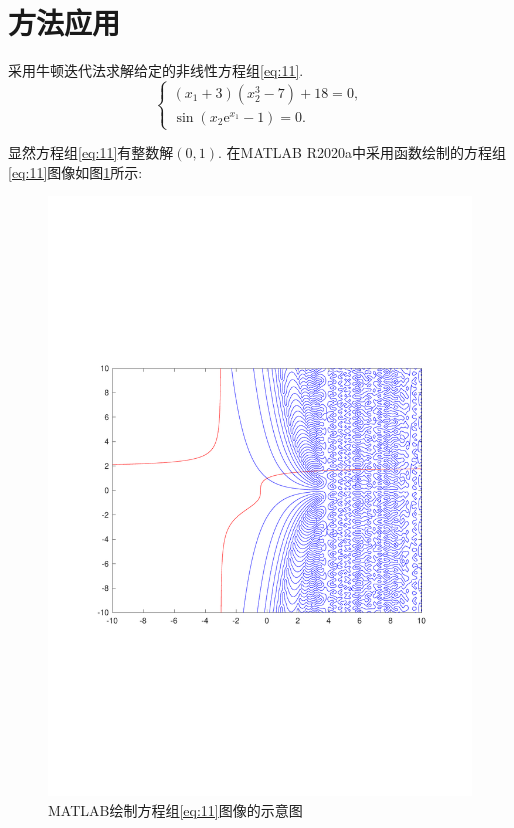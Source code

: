 \documentclass[cn,12pt,founder,a4paper]{elegantpaper}
\newcommand{\e}{\mathrm{e}}
\begin{document}
\section{方法应用}
\setcounter{table}{0}
\setcounter{figure}{0}
\setcounter{equation}{0}
采用牛顿迭代法求解给定的非线性方程组\eqref{eq:11}.
\begin{equation}\label{eq:11}
  \begin{cases}
    (x_1+3)(x_2^3-7)+18=0,\\
    \sin(x_2\e^{x_1}-1)=0.
  \end{cases}
\end{equation}\par
显然方程组\eqref{eq:11}有整数解\((0,1)\). 在M{\footnotesize{ATLAB}} R2020a中采用函数绘制的方程组\eqref{eq:11}图像如图\ref{pic:1}所示:
\begin{figure}[H]
  \centering
  \includegraphics[scale=0.65]{image/MATLAB.pdf}
  \caption{{M\footnotesize{ATLAB}}绘制方程组\eqref{eq:11}图像的示意图}
  \label{pic:1}
\end{figure}\par
\end{document}
